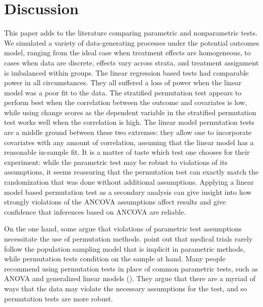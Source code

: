 \documentclass[12pt]{article}
\begin{document}
\section{Discussion}\label{sec:discussion}



This paper adds to the literature comparing parametric and nonparametric tests.
We simulated a variety of data-generating processes under the potential outcomes model, ranging from the ideal case when treatment effects are homogeneous, to cases when data are discrete, effects vary across strata, and treatment assignment is imbalanced within groups.
The linear regression based tests had comparable power in all circumstances.
They all suffered a loss of power when the linear model was a poor fit to the data.
The stratified permutation test appears to perform best when the correlation between the outcome and covariates is low, while using change scores as the dependent variable in the stratified permutation test works well when the correlation is high.
The linear model permutation tests are a middle ground between these two extremes: they allow one to incorporate covariates with any amount of correlation, assuming that the linear model has a reasonable in-sample fit.
It is a matter of taste which test one chooses for their experiment: while the parametric test may be robust to violations of its assumptions, it seems reassuring that the permutation test can exactly match the randomization that was done without additional assumptions.
Applying a linear model based permutation test as a secondary analysis can give insight into how strongly violations of the ANCOVA assumptions affect results
and give confidence that inferences based on ANCOVA are reliable.


On the one hand, some argue that violations of parametric test assumptions necessitate the use of permutation methods.
\cite{ludbrook_why_1998} point out that medical trials rarely follow the population sampling model that is implicit in parametric methods, while permutation tests condition on the sample at hand.
Many people recommend using permutation tests in place of common parametric tests, such as ANOVA and generalized linear models (\cite{still_approximate_1981, winkler_permutation_2014}).
They argue that there are a myriad of ways that the data may violate the necessary assumptions for the test, and so permutation tests are more robust.
\end{document}
